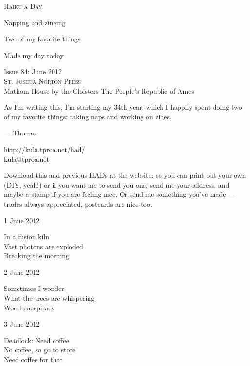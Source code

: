 \documentclass[12pt]{article}
\begin{document}
\begin{center}
{\fontsize{36}{48}\selectfont \textsc{Haiku a Day }}
\end{center}

\vspace*{3.5cm}

{\fontsize{20}{40}\selectfont 

Napping and zineing

Two of my favorite things

Made my day today

}

\vspace*{5.0cm}
\begin{center}
{\large{Issue 84: June 2012}} \\[5mm]
{\fontsize{8}{8}\selectfont  \textsc{ St. Joshua Norton Press }} \\[1mm]
{\fontsize{6}{6}\selectfont Mathom House by the Cloisters \textbar The People's Republic of Ames }
\end{center}


\newpage

As I'm writing this, I'm starting my 34th year, which I happily
spent doing two of my favorite things: taking naps and working on
zines.

--- Thomas

http://kula.tproa.net/had/ \\
kula@tproa.net

Download this and previous HADs at the website, so you can
print out your own (DIY, yeah!) or if you want me to send
you one, send me your address, and maybe a stamp if you
are feeling nice. Or send me something you've made ---
trades always appreciated, postcards are nice too.

\vfill

1 June 2012

In a fusion kiln \\
Vast photons are exploded \\
Breaking the morning

2 June 2012

Sometimes I wonder \\
What the trees are whispering \\
Wood conspiracy


\newpage

3 June 2012

Deadlock: Need coffee \\
No coffee, so go to store \\
Need coffee for that
\end{document}
